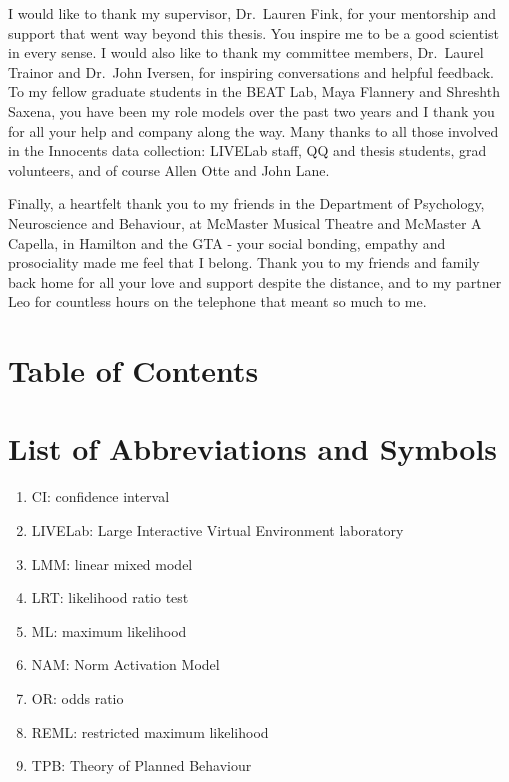 \documentclass[
  man,floatsintext]{apa6}
\providecommand{\tightlist}{%
  \setlength{\itemsep}{0pt}\setlength{\parskip}{0pt}}
\begin{document}
I would like to thank my supervisor, Dr.~Lauren Fink, for your mentorship and support that went way beyond this thesis. You inspire me to be a good scientist in every sense. I would also like to thank my committee members, Dr.~Laurel Trainor and Dr.~John Iversen, for inspiring conversations and helpful feedback. To my fellow graduate students in the BEAT Lab, Maya Flannery and Shreshth Saxena, you have been my role models over the past two years and I thank you for all your help and company along the way. Many thanks to all those involved in the Innocents data collection: LIVELab staff, QQ and thesis students, grad volunteers, and of course Allen Otte and John Lane.

Finally, a heartfelt thank you to my friends in the Department of Psychology, Neuroscience and Behaviour, at McMaster Musical Theatre and McMaster A Capella, in Hamilton and the GTA - your social bonding, empathy and prosociality made me feel that I belong. Thank you to my friends and family back home for all your love and support despite the distance, and to my partner Leo for countless hours on the telephone that meant so much to me.

\newpage

\section*{Table of Contents}\label{table-of-contents}

\tableofcontents

\newpage



\newpage



\newpage

\section*{List of Abbreviations and Symbols}\label{list-of-abbreviations-and-symbols}

\begin{enumerate}
\def\labelenumi{\arabic{enumi}.}
\tightlist
\item
  CI: confidence interval
\item
  LIVELab: Large Interactive Virtual Environment laboratory
\item
  LMM: linear mixed model
\item
  LRT: likelihood ratio test
\item
  ML: maximum likelihood
\item
  NAM: Norm Activation Model
\item
  OR: odds ratio
\item
  REML: restricted maximum likelihood
\item
  TPB: Theory of Planned Behaviour
\end{enumerate}
\end{document}
